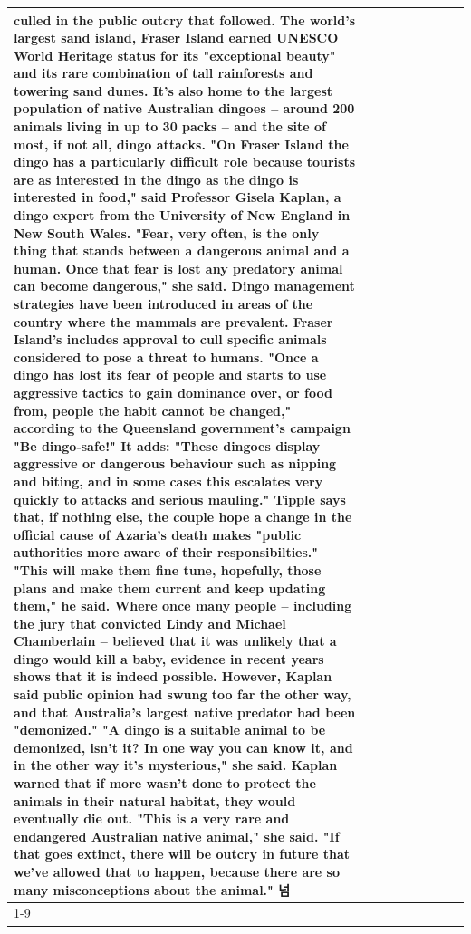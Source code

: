\begin{table}[H]
\begin{tabular}{lllrlllll}
culled in the public outcry that followed. The world's largest sand island, Fraser Island earned UNESCO World Heritage status for its "exceptional beauty" and its rare combination of tall rainforests and towering sand dunes. It's also home to the largest population of native Australian dingoes -- around 200 animals living in up to 30 packs -- and the site of most, if not all, dingo attacks. "On Fraser Island the dingo has a particularly difficult role because tourists are as interested in the dingo as the dingo is interested in food," said Professor Gisela Kaplan, a dingo expert from the University of New England in New South Wales. "Fear, very often, is the only thing that stands between a dangerous animal and a human. Once that fear is lost any predatory animal can become dangerous," she said. Dingo management strategies have been introduced in areas of the country where the mammals are prevalent. Fraser Island's includes approval to cull specific animals considered to pose a threat to humans. "Once a dingo has lost its fear of people and starts to use aggressive tactics to gain dominance over, or food from, people the habit cannot be changed," according to the Queensland government's campaign "Be dingo-safe!" It adds: "These dingoes display aggressive or dangerous behaviour such as nipping and biting, and in some cases this escalates very quickly to attacks and serious mauling." Tipple says that, if nothing else, the couple hope a change in the official cause of Azaria's death makes "public authorities more aware of their responsibilties." "This will make them fine tune, hopefully, those plans and make them current and keep updating them," he said. Where once many people -- including the jury that convicted Lindy and Michael Chamberlain -- believed that it was unlikely that a dingo would kill a baby, evidence in recent years shows that it is indeed possible. However, Kaplan said public opinion had swung too far the other way, and that Australia's largest native predator had been "demonized." "A dingo is a suitable animal to be demonized, isn't it? In one way you can know it, and in the other way it's mysterious," she said. Kaplan warned that if more wasn't done to protect the animals in their natural habitat, they would eventually die out. "This is a very rare and endangered Australian native animal," she said. "If that goes extinct, there will be outcry in future that we've allowed that to happen, because there are so many misconceptions about the animal." 넘 \\
\cline{1-9}

\end{tabular}
\end{table}
